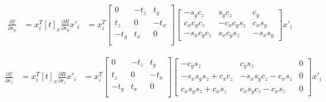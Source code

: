 \documentclass[10pt]{article}         %
\begin{document}
\begin{align*}
  \frac{\partial f}{\partial r_y} 
  &= x_i^T[t]_x\frac{\partial R}{\partial r_y}x'_i
  &= x_i^T\begin{bmatrix} 0 &-t_z &t_y\\t_z &0 &-t_x\\-t_y &t_x &0\\ \end{bmatrix}
  \begin{bmatrix} -s_yc_z & s_yc_z &c_y\\c_xc_yc_z &-c_xc_ys_z &c_xs_y\\
    -s_xc_yc_z &s_xc_ys_z &-s_xs_y \end{bmatrix}x'_i
\end{align*}

\begin{align*}
  \frac{\partial f}{\partial r_z} 
  &= x_i^T[t]_x\frac{\partial R}{\partial r_z}x'_i
  &= x_i^T\begin{bmatrix} 0 &-t_z &t_y\\t_z &0 &-t_x\\-t_y &t_x &0\\ \end{bmatrix}
  \begin{bmatrix} -c_ys_z& c_ys_z &0\\-s_xs_ys_z+c_xc_z &-s_xs_yc_z-c_xs_z &0\\
    c_xs_ys_z+c_xs_z &c_xs_yc_z-c_xs_z &0 \end{bmatrix}x'_i
\end{align*}



\end{document}
